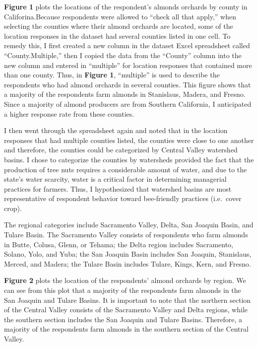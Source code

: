 \documentclass[12pt,]{article}
\begin{document}
\textbf{Figure 1} plots the locations of the respondent's almonds
orchards by county in Califorina.Because respondents were allowed to
``check all that apply,'' when selecting the counties where their almond
orchards are located, some of the location responses in the dataset had
several counties listed in one cell. To remedy this, I first created a
new column in the dataset Excel spreadsheet called ``County.Multiple,''
then I copied the data from the ``County'' column into the new column
and entered in ``multiple'' for location responses that contained more
than one county. Thus, in \textbf{Figure 1}, ``multiple'' is used to
describe the respondents who had almond orchards in several counties.
This figure shows that a majority of the respondents farm almonds in
Stanislaus, Madera, and Fresno. Since a majority of almond producers are
from Southern California, I anticipated a higher response rate from
these counties.

I then went through the spreadsheet again and noted that in the location
responses that had multiple counties listed, the counties were close to
one another and therefore, the counties could be categorized by Central
Valley watershed basins. I chose to categorize the counties by
watersheds provided the fact that the production of tree nuts requires a
considerable amount of water, and due to the state's water scarcity,
water is a critical factor in determining managerial practices for
farmers. Thus, I hypothesized that watershed basins are most
representative of respondent behavior toward bee-friendly practices
(i.e.~cover crop).

The regional categories include Sacramento Valley, Delta, San Joaquin
Basin, and Tulare Basin. The Sacramento Valley consists of respondents
who farm almonds in Butte, Colusa, Glenn, or Tehama; the Delta region
includes Sacramento, Solano, Yolo, and Yuba; the San Joaquin Basin
includes San Joaquin, Stanislaus, Merced, and Madera; the Tulare Basin
includes Tulare, Kings, Kern, and Fresno.

\textbf{Figure 2} plots the location of the respondents' almond orchards
by region. We can see from this plot that a majority of the respondents
farm almonds in the San Joaquin and Tulare Basins. It is important to
note that the northern section of the Central Valley consists of the
Sacramento Valley and Delta regions, while the southern section includes
the San Joaquin and Tulare Basins. Therefore, a majority of the
respondents farm almonds in the southern section of the Central Valley.
\end{document}
